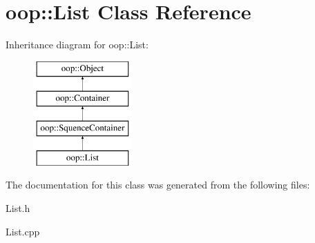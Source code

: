 \hypertarget{classoop_1_1List}{\section{oop\-:\-:\-List \-Class \-Reference}
\label{classoop_1_1List}
}
\-Inheritance diagram for oop\-:\-:\-List\-:\begin{figure}[H]
\begin{center}
\leavevmode
\includegraphics[height=4.000000cm]{classoop_1_1List}
\end{center}
\end{figure}


\-The documentation for this class was generated from the following files\-:\begin{DoxyCompactItemize}
\item 
\-List.\-h\item 
\-List.\-cpp\end{DoxyCompactItemize}
